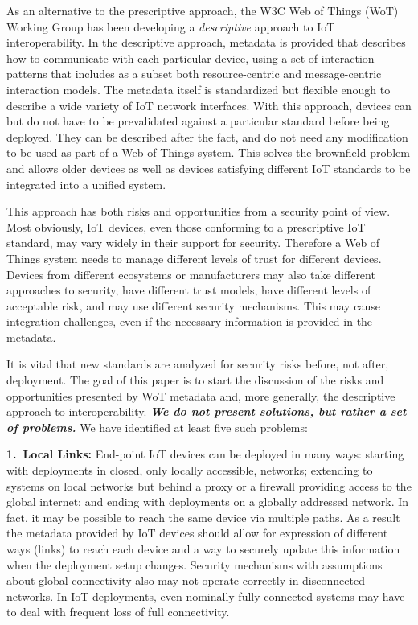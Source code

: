 As an alternative to the prescriptive approach,
the W3C Web of Things (WoT) Working Group has been developing a \emph{descriptive} 
approach to IoT interoperability.
In the descriptive approach,
metadata is provided that describes how to communicate with each particular device,
using a set of interaction patterns that includes as a subset both resource-centric
and message-centric interaction models.
The metadata itself is standardized but flexible enough to describe a wide variety of
IoT network interfaces.
With this approach,
devices can but do not have to be prevalidated against 
a particular standard before being deployed.
They can be described after the fact,
and do not need any modification to be
used as part of a Web of Things system.
This solves the brownfield problem and allows
older devices as well as devices satisfying different IoT 
standards to be integrated into a unified system.  

This approach has both risks and opportunities from a security point of view.
Most obviously, IoT devices, even those conforming to a prescriptive IoT standard,
may vary widely in their support for security.
Therefore a Web of Things system
needs to manage different levels of trust for different devices.
Devices from different ecosystems or manufacturers may also take different approaches to
security, have different trust models, have different levels of acceptable risk,
and may use different security mechanisms. 
This may cause integration challenges, even if the necessary
information is provided in the metadata.

It is vital that new standards are analyzed for security risks before,
not after, deployment.
The goal of this paper is to start the discussion of
the risks and opportunities presented
by WoT metadata and, 
more generally, the descriptive approach to interoperability.  
\textit{\textbf{We do not present solutions, but rather a set of problems.}}
We have identified at least five such problems:

\noindent\textbf{1.~Local Links:}
End-point IoT devices can be deployed in many ways: 
starting with deployments in closed, only locally accessible, networks;
extending to systems on local networks but behind a proxy or a firewall
providing access to the global internet;
and ending with deployments on a globally addressed network.
In fact, it may be possible to reach the same device via multiple paths.
As a result the metadata provided by IoT devices should allow for expression of
different ways (links) to reach each device
and a way to securely update this information when the deployment setup changes.
Security mechanisms with assumptions about global connectivity also may not
operate correctly in disconnected networks.
In IoT deployments, even nominally fully connected systems may have to 
deal with frequent loss of full connectivity.

